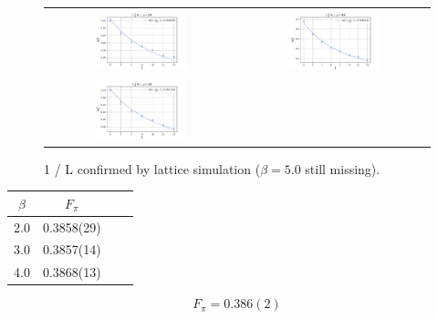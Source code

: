 \documentclass[a4paper,11pt]{article}
\begin{document}
\begin{figure}
  \begin{tabular}{cc}
    \includegraphics[width=0.5\textwidth]{figs/ResMpiBeta2} &
    \includegraphics[width=0.5\textwidth]{figs/ResMpiBeta4} \\
    \includegraphics[width=0.5\textwidth]{figs/ResMpiBeta3}
  \end{tabular}
  \caption{1 / L confirmed by lattice simulation ($\beta = 5.0$ still missing).}
\end{figure}

      \begin{center} 
	    \begin{tabular}{c c c c}
	      $\beta$ & $F_\pi$ \\
	      \hline
	      2.0 & 0.3858(29) \\
	      \hline
	      3.0 & 0.3857(14) \\
	      \hline
	      4.0 & 0.3868(13) \\
	    \end{tabular}
        \[
      	  F_\pi = 0.386(2)
        \]
      \end{center}	 
\end{document}
